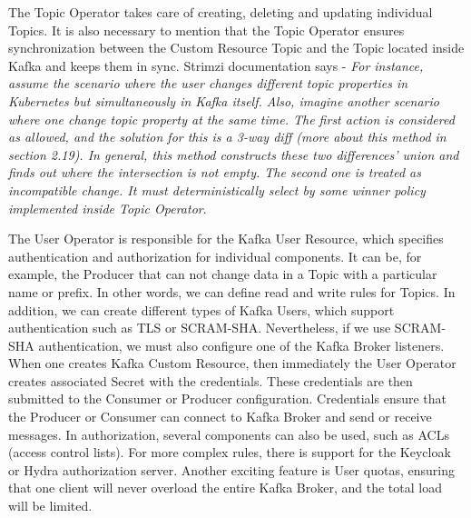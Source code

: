 The Topic Operator takes care of creating, deleting and updating individual Topics.
It is also necessary to mention that the Topic Operator ensures synchronization between the Custom Resource Topic and the Topic located inside Kafka and keeps them in sync.
Strimzi documentation says - \emph{For instance, assume the scenario where the user changes different topic properties in Kubernetes
but simultaneously in Kafka itself. Also, imagine another scenario where one change topic property at the same time. The first action is considered as allowed, and the solution for this is a 3-way diff (more about this method in section 2.19). In general, this method constructs these two differences' union and finds out where the intersection is not empty. The second one is treated as incompatible change. It must deterministically select by some winner policy implemented inside Topic Operator}.

The User Operator is responsible for the Kafka User Resource, which specifies authentication and authorization for individual components.
It can be, for example, the Producer that can not change data in a Topic with a particular name or prefix.
In other words, we can define read and write rules for Topics.
In addition, we can create different types of Kafka Users, which support authentication such as TLS or SCRAM-SHA. Nevertheless, if we use SCRAM-SHA authentication, we must also configure one of the Kafka Broker listeners.
When one creates Kafka Custom Resource, then immediately the User Operator creates associated Secret with the credentials.
These credentials are then submitted to the Consumer or Producer configuration.
Credentials ensure that the Producer or Consumer can connect to Kafka Broker and send or receive messages.
In authorization, several components can also be used, such as ACLs (access control lists).
For more complex rules, there is support for the Keycloak or Hydra authorization server.
Another exciting feature is User quotas, ensuring that one client will never overload the entire Kafka Broker, and the total load will be limited.


